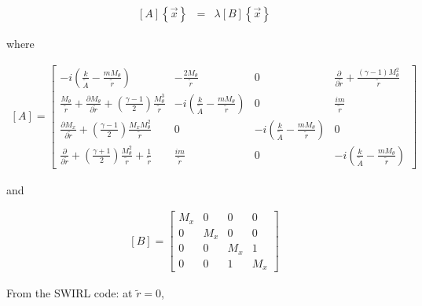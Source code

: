 \documentclass[12pt]{article}
\begin{document}
\begin{eqnarray}
\left[A \right]
\left\{\vec{x} \right\} 
&=&
\lambda
\left[B \right]
\left\{\vec{x} \right\} 
\nonumber
\end{eqnarray}

where

\begin{small}
\begin{eqnarray}
\left[A \right]
=
\left[
\begin{array}{cccc}
-i
\left(
\frac{k}{\widetilde{A}}
- \frac{ m M_{\theta} }{\widetilde{r} }
\right) 
&
-\frac{2 M_{\theta}}{\widetilde{r}}
&
0
&
\frac{\partial}{\partial \widetilde{r}}
+ \frac{\left(\gamma - 1 \right) M_{\theta}^2}{\widetilde{r}}
\\
\frac{M_{\theta} }{\widetilde{r}}
+
\frac{\partial M_{\theta} }{\partial \widetilde{r}}
+
\left(\frac{\gamma - 1}{2} \right) \frac{M_{\theta}^3}{\widetilde{r}}
&
-i
\left(
\frac{k}{\widetilde{A}}
- \frac{ m M_{\theta} }{\widetilde{r} }
\right) 
&
0
&
\frac{i m}{\widetilde{r}}
\\
\frac{\partial M_x }{\partial \widetilde{r}} 
+
\left(\frac{\gamma - 1}{2} \right) \frac{M_x M_{\theta}^2}{\widetilde{r}}
&
0
&
-i
\left(
\frac{k}{\widetilde{A}}
- \frac{ m M_{\theta} }{\widetilde{r} }
\right) 
&
0
\\
\frac{\partial}{\partial \widetilde{r}}
+ 
\left(\frac{\gamma + 1}{2} \right) \frac{M_{\theta}^2}{\widetilde{r}}
+\frac{1 }{\widetilde{r}} 
&
\frac{i m}{\widetilde{r}}
&
0
&
-i
\left(
\frac{k}{\widetilde{A}}
- \frac{ m M_{\theta} }{\widetilde{r} }
\right) 
\end{array}
\right]
\nonumber
\end{eqnarray}
\end{small}%

and

\begin{eqnarray}
\left[B \right]
=
\left[
\begin{array}{cccc}
M_x
&
0
&
0
&
0
\\
0
&
M_x
&
0
&
0
\\
0
&
0
&
M_x
&
1
\\
0
&
0
&
1
&
M_x
\end{array}
\right]
\nonumber
\end{eqnarray}

From the SWIRL code:  at $\widetilde{r} = 0$, 
\end{document}
